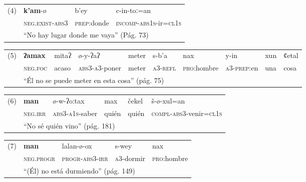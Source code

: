 {\begin{table}[H]
\begin{tabular}{rlll}
      \multicolumn{1}{l}{(4)} & \textbf{k'am}-ø & b'ey  & c-in-toː=an \\
            & \textsc{neg.exist-abs3} & \textsc{prep}:donde & \textsc{incomp-abs1s}-ir=\textsc{cl1s} \\
            & \multicolumn{3}{l}{“No hay lugar donde me vaya” (Pág. 73)} \\
      \end{tabular}%
  \end{table}%
\begin{table}[H]
      \begin{tabular}{rlllllllll}
      \multicolumn{1}{l}{(5)} & \textbf{ʔamax} & mitaʔ & ø-y-ʔaʔ & meter & s-b'a & nax   & y-in  & xun   & ȼetal \\
            & \textsc{neg.foc} & acaso & \textsc{abs3-a3}-poner & meter & \textsc{a3-refl} & \textsc{pro}:hombre & \textsc{a3-prep}:en & una   & cosa \\
            & \multicolumn{9}{l}{“Él no se puede meter en esta cosa” (pág. 75)} \\
      \end{tabular}%
\end{table}%
\begin{table}[H]
      \begin{tabular}{rlllll}
      \multicolumn{1}{l}{(6)} & \textbf{man} & ø-w-ʔoːtax & max   & čekel & š-ø-xul=an \\
            & \textsc{neg.irr} & \textsc{abs3-a1s}-saber & quién & quién & \textsc{compl-abs3}-venir=\textsc{cl1s} \\
            & \multicolumn{5}{l}{“No sé quién vino” (pág. 181)} \\
      \end{tabular}%

\end{table}%
\begin{table}[H]
      \begin{tabular}{rllll}
      \multicolumn{1}{l}{(7)} & \textbf{man} & lalan-ø-ox & s-wey & nax \\
            & \textsc{neg.progr} & \textsc{progr-abs3-irr} & \textsc{a3}-dormir & \textsc{pro}:hombre \\
            & \multicolumn{4}{l}{“(Él) no está durmiendo” (pág. 149)} \\
      \end{tabular}%
  \end{table}%
  
}